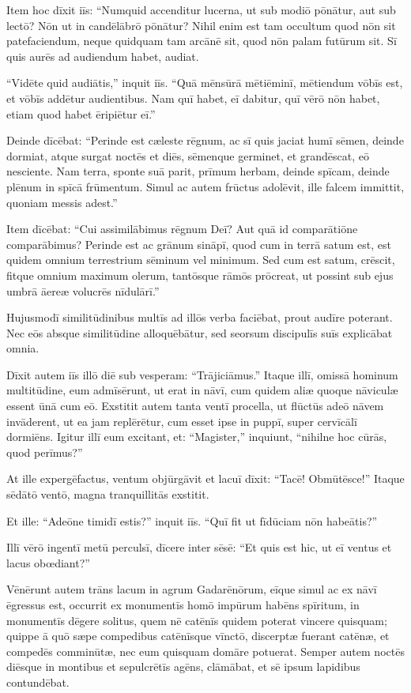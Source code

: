 \Versus Item hoc dīxit iīs: ``Numquid accenditur lucerna, ut sub modiō pōnātur, aut sub lectō? Nōn ut in candēlābrō pōnātur?
\Versus Nihil enim est tam occultum quod nōn sit patefaciendum, neque quidquam tam arcānē sit, quod nōn palam futūrum sit.
\Versus Sī quis aurēs ad audiendum habet, audiat.

\Versus ``Vidēte quid audiātis,'' inquit iīs. ``Quā mēnsūrā mētiēminī, mētiendum vōbīs est, et vōbīs addētur audientibus.
\Versus Nam quī habet, eī dabitur, quī vērō nōn habet, etiam quod habet ēripiētur eī.''

\Versus Deinde dīcēbat: ``Perinde est cæleste rēgnum, ac sī quis jaciat humī sēmen,
\Versus deinde dormiat, atque surgat noctēs et diēs, sēmenque germinet, et grandēscat, eō nesciente.
\Versus Nam terra, sponte suā parit, prīmum herbam, deinde spīcam, deinde plēnum in spīcā frūmentum.
\Versus Simul ac autem frūctus adolēvit, ille falcem immittit, quoniam messis adest.''

\Versus Item dīcēbat: ``Cui assimilābimus rēgnum Deī? Aut quā id comparātiōne comparābimus?
\Versus Perinde est ac grānum sināpī, quod cum in terrā satum est, est quidem omnium terrestrium sēminum vel minimum.
\Versus Sed cum est satum, crēscit, fitque omnium maximum olerum, tantōsque rāmōs prōcreat, ut possint sub ejus umbrā āereæ volucrēs nīdulārī.''

\Versus Hujusmodī similitūdinibus multīs ad illōs verba faciēbat, prout audīre poterant.
\Versus Nec eōs absque similitūdine alloquēbātur, sed seorsum discipulīs suīs explicābat omnia.

\Versus Dīxit autem iīs illō diē sub vesperam: ``Trājiciāmus.''
\Versus Itaque illī, omissā hominum multitūdine, eum admīsērunt, ut erat in nāvī, cum quidem aliæ quoque nāviculæ essent ūnā cum eō.
\Versus Exstitit autem tanta ventī procella, ut flūctūs adeō nāvem invāderent, ut ea jam replērētur,
\Versus cum esset ipse in puppī, super cervīcālī dormiēns. Igitur illī eum excitant, et: ``Magister,'' inquiunt, ``nihilne hoc cūrās, quod perīmus?''

\Versus At ille expergēfactus, ventum objūrgāvit et lacuī dīxit: ``Tacē! Obmūtēsce!'' Itaque sēdātō ventō, magna tranquillitās exstitit.

\Versus Et ille: ``Adeōne timidī estis?'' inquit iīs. ``Quī fit ut fīdūciam nōn habeātis?''

\Versus Illī vērō ingentī metū perculsī, dīcere inter sēsē: ``Et quis est hic, ut eī ventus et lacus obœdiant?''


\Caput
\Versus Vēnērunt autem trāns lacum in agrum Gadarēnōrum,
\Versus eīque simul ac ex nāvī ēgressus est, occurrit ex monumentīs homō impūrum habēns spīritum,
\Versus in monumentīs dēgere solitus, quem nē catēnīs quidem poterat vincere quisquam;
\Versus quippe ā quō sæpe compedibus catēnīsque vīnctō, discerptæ fuerant catēnæ, et compedēs comminūtæ, nec eum quisquam domāre potuerat.
\Versus Semper autem noctēs diēsque in montibus et sepulcrētīs agēns, clāmābat, et sē ipsum lapidibus contundēbat.


